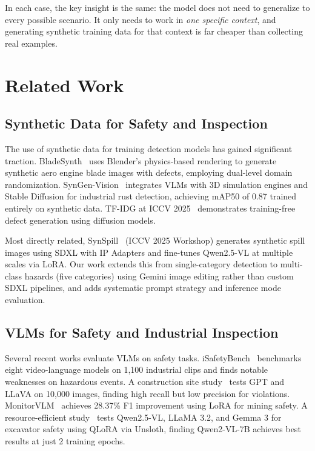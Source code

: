 \documentclass[12pt, a4paper]{article}
\begin{document}
In each case, the key insight is the same: the model does not need to generalize to every possible scenario. It only needs to work in \textit{one specific context}, and generating synthetic training data for that context is far cheaper than collecting real examples.

\section{Related Work}

\subsection{Synthetic Data for Safety and Inspection}

The use of synthetic data for training detection models has gained significant traction. BladeSynth~\cite{bladeSynth2025} uses Blender's physics-based rendering to generate synthetic aero engine blade images with defects, employing dual-level domain randomization. SynGen-Vision~\cite{syngenVision2025} integrates VLMs with 3D simulation engines and Stable Diffusion for industrial rust detection, achieving mAP50 of 0.87 trained entirely on synthetic data. TF-IDG at ICCV 2025~\cite{tfidg2025} demonstrates training-free defect generation using diffusion models.

Most directly related, SynSpill~\cite{synspill2025} (ICCV 2025 Workshop) generates synthetic spill images using SDXL with IP Adapters and fine-tunes Qwen2.5-VL at multiple scales via LoRA. Our work extends this from single-category detection to multi-class hazards (five categories) using Gemini image editing rather than custom SDXL pipelines, and adds systematic prompt strategy and inference mode evaluation.

\subsection{VLMs for Safety and Industrial Inspection}

Several recent works evaluate VLMs on safety tasks. iSafetyBench~\cite{isafetybench2025} benchmarks eight video-language models on 1,100 industrial clips and finds notable weaknesses on hazardous events. A construction site study~\cite{constructionVLM2025} tests GPT and LLaVA on 10,000 images, finding high recall but low precision for violations. MonitorVLM~\cite{monitorVLM2025} achieves 28.37\% F1 improvement using LoRA for mining safety. A resource-efficient study~\cite{excavatorVLM2025} tests Qwen2.5-VL, LLaMA 3.2, and Gemma 3 for excavator safety using QLoRA via Unsloth, finding Qwen2-VL-7B achieves best results at just 2 training epochs.
\end{document}
